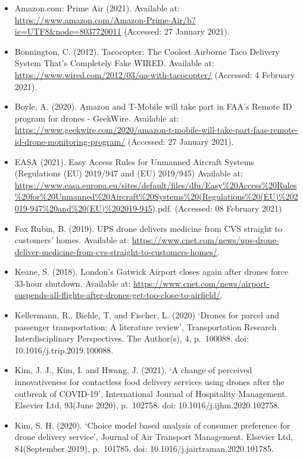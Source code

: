 \documentclass[
]{book}
\providecommand{\tightlist}{%
  \setlength{\itemsep}{0pt}\setlength{\parskip}{0pt}}
\begin{document}
\begin{itemize}
\tightlist
\item
  Amazon.com: Prime Air (2021). Available at: \url{https://www.amazon.com/Amazon-Prime-Air/b?ie=UTF8\&node=8037720011} (Accessed: 27 January 2021).
\item
  Bonnington, C. (2012). Tacocopter: The Coolest Airborne Taco Delivery System That's Completely Fake \textbar{} WIRED. Available at: \url{https://www.wired.com/2012/03/qa-with-tacocopter/} (Accessed: 4 February 2021).
\item
  Boyle, A. (2020). Amazon and T-Mobile will take part in FAA's Remote ID program for drones - GeekWire. Available at: \url{https://www.geekwire.com/2020/amazon-t-mobile-will-take-part-faas-remote-id-drone-monitoring-program/} (Accessed: 27 January 2021).
\item
  EASA (2021). Easy Access Rules for Unmanned Aircraft Systems (Regulations (EU) 2019/947 and (EU) 2019/945) Available at: \url{https://www.easa.europa.eu/sites/default/files/dfu/Easy\%20Access\%20Rules\%20for\%20Unmanned\%20Aircraft\%20Systems\%20(Regulations\%20(EU)\%202019-947\%20and\%20(EU)\%202019-945}).pdf. (Accessed: 08 February 2021)
\item
  Fox Rubin, B. (2019). UPS drone delivers medicine from CVS straight to customers' homes. Available at: \url{https://www.cnet.com/news/ups-drone-deliver-medicine-from-cvs-straight-to-customers-homes/}.
\item
  Keane, S. (2018). London's Gatwick Airport closes again after drones force 33-hour shutdown. Available at: \url{https://www.cnet.com/news/airport-suspends-all-flights-after-drones-get-too-close-to-airfield/}.
\item
  Kellermann, R., Biehle, T. and Fischer, L. (2020) `Drones for parcel and passenger transportation: A literature review', Transportation Research Interdisciplinary Perspectives. The Author(s), 4, p.~100088. doi: 10.1016/j.trip.2019.100088.
\item
  Kim, J. J., Kim, I. and Hwang, J. (2021). `A change of perceived innovativeness for contactless food delivery services using drones after the outbreak of COVID-19', International Journal of Hospitality Management. Elsevier Ltd, 93(June 2020), p.~102758. doi: 10.1016/j.ijhm.2020.102758.
\item
  Kim, S. H. (2020). `Choice model based analysis of consumer preference for drone delivery service', Journal of Air Transport Management. Elsevier Ltd, 84(September 2019), p.~101785. doi: 10.1016/j.jairtraman.2020.101785.

\end{itemize}
\end{document}
